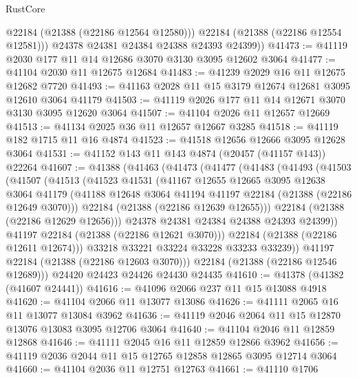 \begin{lexlean}{RustCore}
\begin{coremodule}
            @22184
            (@21388 (@22186 @12564 @12580)))
          @22184
          (@21388 (@22186 @12554 @12581)))
        @24378
        @24381
        @24384
        @24388
        @24393
        @24399))
@41473 := @41119 @2030 @177 @11 @14 @12686 @3070 @3130 @3095 @12602 @3064
@41477 := @41104 @2030 @11 @12675 @12684
@41483 := @41239 @2029 @16 @11 @12675 @12682 @7720
@41493 := @41163 @2028 @11 @15 @3179 @12674 @12681 @3095 @12610 @3064 @41179
@41503 := @41119 @2026 @177 @11 @14 @12671 @3070 @3130 @3095 @12620 @3064
@41507 := @41104 @2026 @11 @12657 @12669
@41513 := @41134 @2025 @36 @11 @12657 @12667 @3285
@41518 := @41119 @182 @1715 @11 @16 @4874
@41523 := @41518 @12656 @12666 @3095 @12628 @3064
@41531 := @41152 @143 @11 @143 @4874 (@20457 (@41157 @143)) @22264
@41607 := @41388
    (@41463
      (@41473
        (@41477
          (@41483
            (@41493
              (@41503
                (@41507
                  (@41513
                    (@41523
                      @41531
                      (@41167
                        @12655
                        @12665
                        @3095
                        @12638
                        @3064
                        @41179
                        (@41188 @12648 @3064 @41194 @41197 @22184 (@21388 (@22186 @12649 @3070)))
                        @22184
                        (@21388 (@22186 @12639 @12655)))
                      @22184
                      (@21388 (@22186 @12629 @12656)))
                    @24378
                    @24381
                    @24384
                    @24388
                    @24393
                    @24399))
                @41197
                @22184
                (@21388 (@22186 @12621 @3070)))
              @22184
              (@21388 (@22186 @12611 @12674)))
            @33218
            @33221
            @33224
            @33228
            @33233
            @33239))
        @41197
        @22184
        (@21388 (@22186 @12603 @3070)))
      @22184
      (@21388 (@22186 @12546 @12689)))
    @24420
    @24423
    @24426
    @24430
    @24435
@41610 := @41378 (@41382 (@41607 @24441))
@41616 := @41096 @2066 @237 @11 @15 @13088 @4918
@41620 := @41104 @2066 @11 @13077 @13086
@41626 := @41111 @2065 @16 @11 @13077 @13084 @3962
@41636 := @41119 @2046 @2064 @11 @15 @12870 @13076 @13083 @3095 @12706 @3064
@41640 := @41104 @2046 @11 @12859 @12868
@41646 := @41111 @2045 @16 @11 @12859 @12866 @3962
@41656 := @41119 @2036 @2044 @11 @15 @12765 @12858 @12865 @3095 @12714 @3064
@41660 := @41104 @2036 @11 @12751 @12763
@41661 := @41110 @1706

\end{coremodule}
\end{lexlean}
